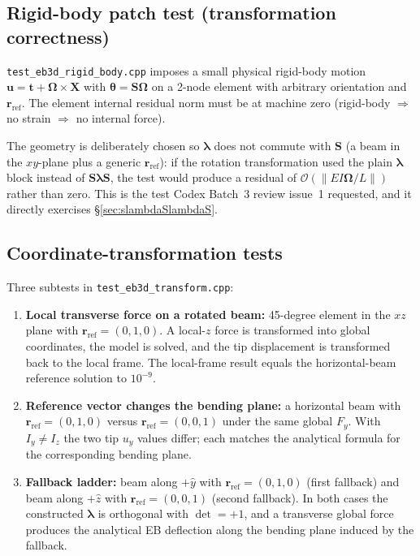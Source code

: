 \documentclass[11pt,a4paper]{article}
\newcommand{\bmath}[1]{\boldsymbol{#1}}
\begin{document}
\subsection{Rigid-body patch test (transformation correctness)}

\texttt{test\_eb3d\_rigid\_body.cpp} imposes a small physical rigid-body motion $\bmath{u} = \bmath{t} + \bmath{\Omega}\times\bmath{X}$ with $\bmath{\theta} = \bmath{S}\bmath{\Omega}$ on a 2-node element with arbitrary orientation and $\bmath{r}_{\text{ref}}$. The element internal residual norm must be at machine zero (rigid-body $\Rightarrow$ no strain $\Rightarrow$ no internal force).

The geometry is deliberately chosen so $\bmath{\lambda}$ does not commute with $\bmath{S}$ (a beam in the $xy$-plane plus a generic $\bmath{r}_{\text{ref}}$): if the rotation transformation used the plain $\bmath{\lambda}$ block instead of $\bmath{S}\bmath{\lambda}\bmath{S}$, the test would produce a residual of $\mathcal{O}(\|EI\bmath{\Omega}/L\|)$ rather than zero. This is the test Codex Batch~3 review issue~1 requested, and it directly exercises \S\ref{sec:slambdaSlambdaS}.

\subsection{Coordinate-transformation tests}

Three subtests in \texttt{test\_eb3d\_transform.cpp}:
\begin{enumerate}
    \item \textbf{Local transverse force on a rotated beam:} 45-degree element in the $xz$ plane with $\bmath{r}_{\text{ref}} = (0,1,0)$. A local-$z$ force is transformed into global coordinates, the model is solved, and the tip displacement is transformed back to the local frame. The local-frame result equals the horizontal-beam reference solution to $10^{-9}$.
    \item \textbf{Reference vector changes the bending plane:} a horizontal beam with $\bmath{r}_{\text{ref}} = (0,1,0)$ versus $\bmath{r}_{\text{ref}} = (0,0,1)$ under the same global $F_y$. With $I_y \ne I_z$ the two tip $u_y$ values differ; each matches the analytical formula for the corresponding bending plane.
    \item \textbf{Fallback ladder:} beam along $+\hat{y}$ with $\bmath{r}_{\text{ref}} = (0,1,0)$ (first fallback) and beam along $+\hat{z}$ with $\bmath{r}_{\text{ref}} = (0,0,1)$ (second fallback). In both cases the constructed $\bmath{\lambda}$ is orthogonal with $\det = +1$, and a transverse global force produces the analytical EB deflection along the bending plane induced by the fallback.
\end{enumerate}
\end{document}
